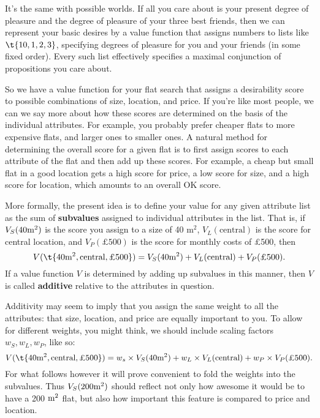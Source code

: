 
It's the same with possible worlds. If all you care about is your
present degree of pleasure and the degree of pleasure of your three
best friends, then we can represent your basic desires by a value
function that assigns numbers to lists like $\t{10, 1, 2, 3}$,
specifying degrees of pleasure for you and your friends (in some fixed
order). Every such list effectively specifies a maximal conjunction of
propositions you care about.

So we have a value function for your flat search that assigns a
desirability score to possible combinations of size, location, and
price. If you're like most people, we can we say more about how these
scores are determined on the basis of the individual attributes. For
example, you probably prefer cheaper flats to more expensive flats,
and larger ones to smaller ones. A natural method for determining the
overall score for a given flat is to first assign scores to each
attribute of the flat and then add up these scores. For example, a
cheap but small flat in a good location gets a high score for price, a
low score for size, and a high score for location, which amounts to an
overall OK score.

More formally, the present idea is to define your value for any given
attribute list as the sum of \textbf{subvalues} assigned to individual
attributes in the list. That is, if $V_{S}(40 \text{m}^2)$ is the score you
assign to a size of 40 m$^2$, $V_{L}(\text{central})$ is the score for
central location, and $V_{P}(\text{£500})$ is the score for monthly
costs of £500, then
\[
V(\t{40 \m^2, \text{central}, \text{£500}}) = V_{S}(40 \m^2) +
V_{L}(\text{central}) + V_{P}(\text{£500}).
\]
%
If a value function $V$ is determined by adding up subvalues
in this manner, then $V$ is called \textbf{additive} relative to the
attributes in question.

Additivity may seem to imply that you assign the same weight to
all the attributes: that size, location, and price are equally
important to you. To allow for different weights, you might think, we
should include scaling factors $w_S, w_L, w_P$, like so:
\[
V(\t{40 \m^2, \text{central}, \text{£500}}) = w_s \times V_{S}(40 \m^2) +
w_L \times V_{L}(\text{central}) + w_P \times V_{P}(\text{£500}).
\]
For what follows however it will prove convenient to fold the weights
into the subvalues. Thus $V_S(200 \text{m}^2)$ should reflect not only how
awesome it would be to have a 200 $\text{m}^2$ flat, but also how important
this feature is compared to price and location.

